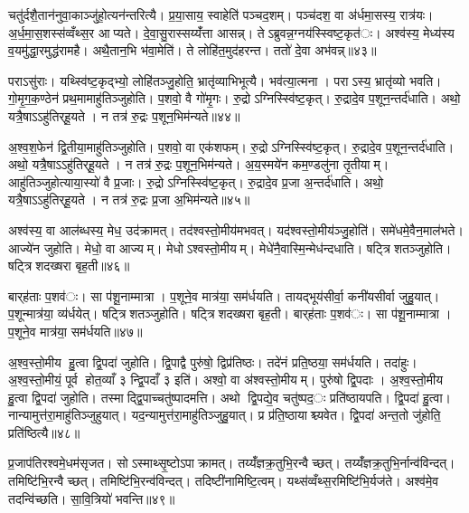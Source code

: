चतु॑र्दशै॒तान॑नुवा॒काञ्जु॑हो॒त्यन॑न्तरित्यै। प्र॒या॒साय॒ स्वाहेति॑ पञ्चद॒शम्। पञ्च॑दश॒ वा अ॑र्धमा॒सस्य॒ रात्र॑यः। अ॒र्ध॒मा॒स॒शस्स॑व्वँथ्स॒र आप्यते। दे॒वा॒सु॒रास्सय्यँ॑त्ता आसन्न्। तेऽब्रुवन्न॒ग्नय॑स्स्विष्ट॒कृत॑ः। अश्व॑स्य॒ मेध्य॑स्य व॒यमु॑द्धा॒रमुद्ध॑रामहै। अथै॒तान॒भि भ॑वा॒मेति॑। ते लोहि॑त॒मुद॑हरन्त। ततो॑ दे॒वा अभ॑वन्न्॥४३॥

पराऽसु॑राः। यथ्स्वि॑ष्ट॒कृद्भ्यो॒ लोहि॑तञ्जु॒होति॒ भ्रातृ॑व्याभिभूत्यै। भव॑त्या॒त्मना। पराऽस्य॒ भ्रातृ॑व्यो भवति। गो॒मृ॒ग॒क॒ण्ठेन॑ प्रथ॒मामाहु॑तिञ्जुहोति। प॒शवो॒ वै गो॑मृ॒गः। रु॒द्रोऽग्निस्स्वि॑ष्ट॒कृत्। रु॒द्रादे॒व प॒शून॒न्तर्द॑धाति। अथो॒ यत्रै॒षाऽऽहु॑तिर्‌हू॒यते। न तत्र॑ रु॒द्रः प॒शून॒भिम॑न्यते॥४४॥

अ॒श्व॒श॒फेन॑ द्वि॒तीया॒माहु॑तिञ्जुहोति। प॒शवो॒ वा एक॑शफम्। रु॒द्रोऽग्निस्स्वि॑ष्ट॒कृत्। रु॒द्रादे॒व प॒शून॒न्तर्द॑धाति। अथो॒ यत्रै॒षाऽऽहु॑तिर्‌हू॒यते। न तत्र॑ रु॒द्रः प॒शून॒भिम॑न्यते। अ॒य॒स्मये॑न कम॒ण्डलु॑ना तृ॒तीयाम्। आहु॑तिञ्जुहोत्याया॒स्यो॑ वै प्र॒जाः। रु॒द्रोऽग्निस्स्वि॑ष्ट॒कृत्। रु॒द्रादे॒व प्र॒जा अ॒न्तर्द॑धाति। अथो॒ यत्रै॒षाऽऽहु॑तिर्‌हू॒यते। न तत्र॑ रु॒द्रः प्र॒जा अ॒भिम॑न्यते॥४५॥


अश्व॑स्य॒ वा आल॑ब्धस्य॒ मेध॒ उद॑क्रामत्। तद॑श्वस्तो॒मीय॑मभवत्। यद॑श्वस्तो॒मीय॑ञ्जु॒होति॑। समे॑धमे॒वैन॒माल॑भते। आज्ये॑न जुहोति। मेधो॒ वा आज्यम्। मेधोऽश्वस्तो॒मीयम्। मेधे॑नै॒वास्मि॒न्मेध॑न्दधाति। षट्त्रिशतञ्जुहोति। षट्त्रिशदख्षरा बृह॒ती॥४६॥

बार्‌ह॑ताः प॒शव॑ः। सा प॑शू॒नाम्मात्रा। प॒शूने॒व मात्र॑या॒ सम॑र्धयति। तायद्भूय॑सीर्वा॒ कनी॑यसीर्वा जुहु॒यात्। प॒शून्मात्र॑या॒ व्य॑र्धयेत्। षट्त्रिशतञ्जुहोति। षट्त्रिशदख्षरा बृह॒ती। बार्‌ह॑ताः प॒शव॑ः। सा प॑शू॒नाम्मात्रा। प॒शूने॒व मात्र॑या॒ सम॑र्धयति॥४७॥

अ॒श्व॒स्तो॒मीय हु॒त्वा द्वि॒पदा॑ जुहोति। द्वि॒पाद्वै पुरु॑षो॒ द्विप्र॑तिष्ठः। तदे॑नं प्रति॒ष्ठया॒ सम॑र्धयति। तदा॑हुः। अ॒श्व॒स्तो॒मीयं॒ पूर्व होत॒व्याँ ३ न्द्वि॒पदाँ ३ इति॑। अश्वो॒ वा अ॑श्वस्तो॒मीयम्। पुरु॑षो द्वि॒पदाः। अ॒श्व॒स्तो॒मीय हु॒त्वा द्वि॒पदा॑ जुहोति। तस्माद्द्वि॒पाच्चतु॑ष्पादमत्ति। अथो द्वि॒पद्ये॒व चतु॑ष्पद॒ः प्रति॑ष्ठायपति। द्वि॒पदा॑ हु॒त्वा। नान्यामुत्त॑रा॒माहु॑तिञ्जुहुयात्। यद॒न्यामुत्त॑रा॒माहु॑तिञ्जुहु॒यात्। प्र प्र॑ति॒ष्ठायाश्च्यवेत। द्वि॒पदा॑ अन्त॒तो जु॑होति॒ प्रति॑ष्ठित्यै॥४८॥


प्र॒जाप॑तिरश्वमे॒धम॑सृजत। सोऽस्माथ्सृ॒ष्टोऽपाक्रामत्। तय्यँ॑ज्ञक्र॒तुभि॒रन्वैच्छत्। तय्यँ॑ज्ञक्र॒तुभि॒र्नान्व॑विन्दत्। तमिष्टि॑भि॒रन्वैच्छत्। तमिष्टि॑भि॒रन्व॑विन्दत्। तदिष्टी॑नामिष्टि॒त्वम्। यथ्स॑व्वँथ्स॒रमिष्टि॑भि॒र्यज॑ते। अश्व॑मे॒व तदन्वि॑च्छति। सा॒वि॒त्रियो॑ भवन्ति॥४९॥


